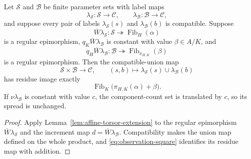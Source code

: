 \begin{corollary}\label{cor:compatible-affine-extension}
Let $\mathscr S$ and $\mathscr B$ be finite parameter sets with label maps
\[
\lambda_{\mathscr S}:\mathscr S\to\mathcal C,
\qquad
\lambda_{\mathscr B}:\mathscr B\to\mathcal C,
\]
and suppose every pair of labels $\lambda_{\mathscr S}(s)$ and $\lambda_{\mathscr B}(b)$ is compatible.  Suppose
\[
\overline W\lambda_{\mathscr S}:\mathscr S\twoheadrightarrow\operatorname{Fib}_H(\alpha)
\]
is a regular epimorphism, $q_K\overline W\lambda_{\mathscr B}$ is constant with value $\beta\in A/K$, and
\begin{equation}\label{eq:compatible-affine-quotient-epi}
q_H\overline W\lambda_{\mathscr B}:\mathscr B\twoheadrightarrow
\operatorname{Fib}_{\pi_{H,K}}(\beta)
\end{equation}
is a regular epimorphism.  Then the compatible-union map
\[
\mathscr S\times\mathscr B\longrightarrow\mathcal C,
\qquad
(s,b)\longmapsto\lambda_{\mathscr S}(s)\cup\lambda_{\mathscr B}(b)
\]
has residue image exactly
\[
\operatorname{Fib}_K\!\bigl(\pi_{H,K}(\alpha)+\beta\bigr).
\]
If $\nu\lambda_{\mathscr B}$ is constant with value $c$, the component-count set is translated by $c$, so its spread is unchanged.
\end{corollary}

\begin{proof}
Apply Lemma~\ref{lem:affine-torsor-extension} to the regular epimorphism $\overline W\lambda_{\mathscr S}$ and the increment map $d=\overline W\lambda_{\mathscr B}$.  Compatibility makes the union map defined on the whole product, and \eqref{eq:observation-square} identifies its residue map with addition.
\end{proof}

